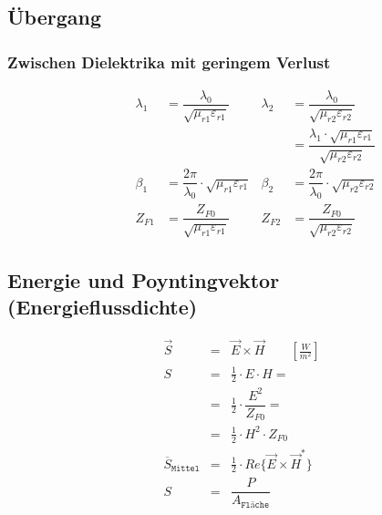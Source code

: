 \subsection{Übergang}
\subsubsection{Zwischen Dielektrika mit geringem Verlust}


\begin{align*}
    \quad \qquad \lambda_1 & = \dfrac{\lambda_0}{\sqrt{\mu_{r1}\varepsilon_{r1}}}          & \lambda_2 & = \dfrac{\lambda_0}{\sqrt{\mu_{r2}\varepsilon_{r2}}}                                     \\
    \quad \qquad           &                                                               &           & = \dfrac{\lambda_1\cdot\sqrt{\mu_{r1}\varepsilon_{r1}}}{\sqrt{\mu_{r2}\varepsilon_{r2}}} \\
    \quad \qquad \beta_1   & = \dfrac{2\pi}{\lambda_0}\cdot\sqrt{\mu_{r1}\varepsilon_{r1}} & \beta_2   & = \dfrac{2\pi}{\lambda_0}\cdot\sqrt{\mu_{r2}\varepsilon_{r2}}                            \\
    \quad \qquad Z_{F1}    & = \dfrac{Z_{F0}}{\sqrt{\mu_{r1}\varepsilon_{r1}}}             & Z_{F2}    & = \dfrac{Z_{F0}}{\sqrt{\mu_{r2}\varepsilon_{r2}}}
\end{align*}

\subsection{Energie und Poyntingvektor (Energieflussdichte)}
\begin{align*}
     & \vec{S}                        & = & \vec{E}\times\vec{H} \qquad \si{\left[\frac{W}{m^2}\right]}         \\
     & S                              & = & \frac{1}{2} \cdot E \cdot H =                                       \\
     &                                & = & \frac{1}{2} \cdot \dfrac{E^2}{Z_{F0}} =                             \\
     &                                & = & \frac{1}{2} \cdot H^2 \cdot Z_{F0}                                  \\
     & \overline{S}_{\texttt{Mittel}} & = & \frac{1}{2} \cdot Re\{\vec{E}\times\vec{H}^*\}                      \\
     & S                              & = & \dfrac{P}{A_\texttt{Fläche}}  \\
\end{align*}

